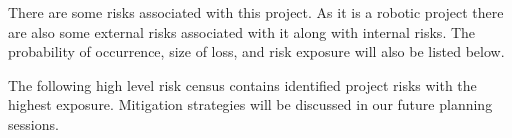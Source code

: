There are some risks associated with this project. As it is a robotic project there are also some external risks associated with it along with internal risks. The probability of occurrence, size of loss, and risk exposure will also be listed below.


The following high level risk census contains identified project risks with the highest exposure. Mitigation strategies will be discussed in our future planning sessions.

\begin{table}[h]
\caption{Overview of highest exposure project risks} 
\end{table}
